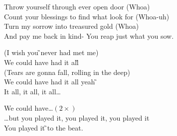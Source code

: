 {\Am{}Throw yourself through ever open door (Whoa)\\
Count your blessings to find what look for (Whoa-uh)\\
Turn my sorrow into treasured gold (Whoa)\\
And pay me back in kind- You reap just what you sow.

\chorus{}(\Am{}I wish you \G{}never had met me)\\
We could have had it \F{}all\G{}\\
(Tears are gonna fall, rolling in the deep)\\
We could have had it \Am{}all yeah \G{}\\
\F{}It all, it all, it all\ldots

\chorus{}We could have\ldots $(2\times)$\\
\vspace{8pt}
\ldots but you \F{}played it, you played it, you played it\\
You played it \G{}to the \Am{}beat.\\
}


